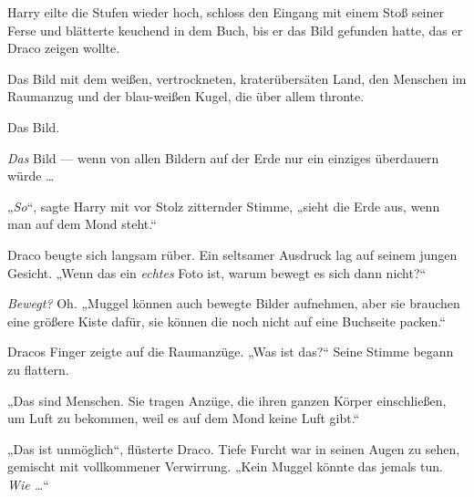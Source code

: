 Harry eilte die Stufen wieder hoch, schloss den Eingang mit einem Stoß seiner Ferse und blätterte keuchend in dem Buch, bis er das Bild gefunden hatte, das er Draco zeigen wollte.

Das Bild mit dem weißen, vertrockneten, kraterübersäten Land, den Menschen im Raumanzug und der blau-weißen Kugel, die über allem thronte.

Das Bild.

\emph{Das} Bild — wenn von allen Bildern auf der Erde nur ein einziges überdauern würde …

„\emph{So}“, sagte Harry mit vor Stolz zitternder Stimme, „sieht die Erde aus, wenn man auf dem Mond steht.“

Draco beugte sich langsam rüber. Ein seltsamer Ausdruck lag auf seinem jungen Gesicht.
„Wenn das ein \emph{echtes} Foto ist, warum bewegt es sich dann nicht?“

\emph{Bewegt?} Oh.
„Muggel können auch bewegte Bilder aufnehmen, aber sie brauchen eine größere Kiste dafür, sie können die noch nicht auf eine Buchseite packen.“

Dracos Finger zeigte auf die Raumanzüge.
„Was ist das?“ Seine Stimme begann zu flattern.

„Das sind Menschen. Sie tragen Anzüge, die ihren ganzen Körper einschließen, um Luft zu bekommen, weil es auf dem Mond keine Luft gibt.“

„Das ist unmöglich“, flüsterte Draco. Tiefe Furcht war in seinen Augen zu sehen, gemischt mit vollkommener Verwirrung.
„Kein Muggel könnte das jemals tun. \emph{Wie …}“

